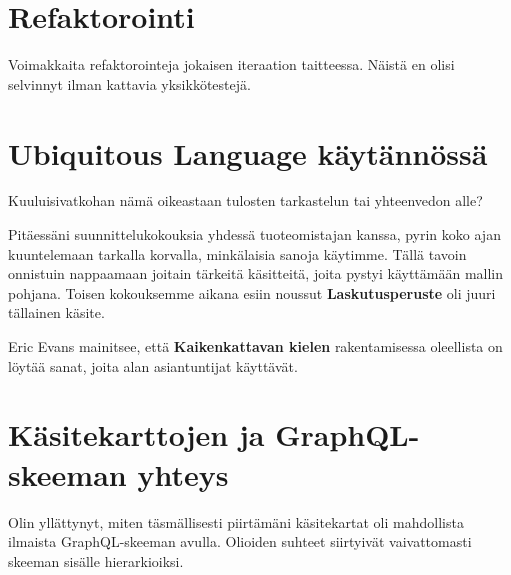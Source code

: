 \hypertarget{refaktorointi}{%
\section{Refaktorointi}\label{refaktorointi}}

Voimakkaita refaktorointeja jokaisen iteraation taitteessa. Näistä en
olisi selvinnyt ilman kattavia yksikkötestejä.

\hypertarget{ubiquitous-language-kuxe4ytuxe4nnuxf6ssuxe4}{%
\section{Ubiquitous Language
käytännössä}\label{ubiquitous-language-kuxe4ytuxe4nnuxf6ssuxe4}}

Kuuluisivatkohan nämä oikeastaan tulosten tarkastelun tai yhteenvedon
alle?

Pitäessäni suunnittelukokouksia yhdessä tuoteomistajan kanssa, pyrin
koko ajan kuuntelemaan tarkalla korvalla, minkälaisia sanoja käytimme.
Tällä tavoin onnistuin nappaamaan joitain tärkeitä käsitteitä, joita
pystyi käyttämään mallin pohjana. Toisen kokouksemme aikana esiin
noussut \textbf{Laskutusperuste} oli juuri tällainen käsite.

Eric Evans mainitsee, että \textbf{Kaikenkattavan kielen} rakentamisessa
oleellista on löytää sanat, joita alan asiantuntijat käyttävät.

\hypertarget{kuxe4sitekarttojen-ja-graphql-skeeman-yhteys}{%
\section{Käsitekarttojen ja GraphQL-skeeman
yhteys}\label{kuxe4sitekarttojen-ja-graphql-skeeman-yhteys}}

Olin yllättynyt, miten täsmällisesti piirtämäni käsitekartat oli
mahdollista ilmaista GraphQL-skeeman avulla. Olioiden suhteet siirtyivät
vaivattomasti skeeman sisälle hierarkioiksi.
